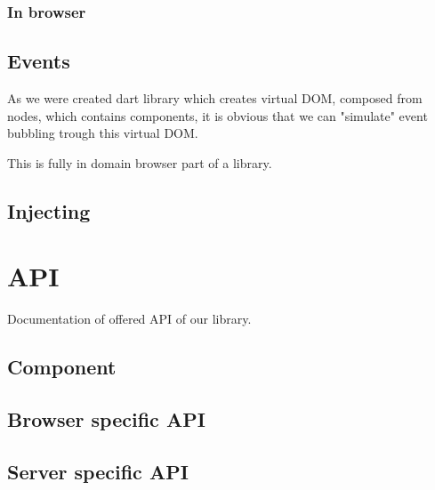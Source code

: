     \subsubsection{In browser}\label{subsec:our-architecture-rendering-browser}
  \subsection{Events}\label{subsec:our-architecture-events}
    As we were created dart library which creates virtual DOM, composed from nodes, which contains components, 
    it is obvious that we can "simulate" event bubbling trough this virtual DOM. 

    This is fully in domain browser part of a library.

  \subsection{Injecting}\label{subsec:our-architecture-injecting}

\section{API}\label{sec:our-api}

  Documentation of offered API of our library.

  \subsection{Component}\label{subsec:our-api-component}
  \subsection{Browser specific API}\label{subsec:our-api-browser}
  \subsection{Server specific API}\label{subsec:our-api-server}
